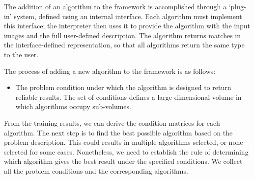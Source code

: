 The addition of an algorithm to the framework is accomplished through a `plug-in' system, defined using an internal interface. Each algorithm must implement this interface; the interpreter then uses it to provide the algorithm with the input images and the full user-defined description. The algorithm returns matches in the interface-defined representation, so that all algorithms return the same type to the user.

The process of adding a new algorithm to the framework is as follows:
\begin{itemize}
\item The problem condition under which the algorithm is designed to return reliable results. The set of conditions defines a large dimensional volume in which algorithms occupy sub-volumes.
\end{itemize}

From the training results, we can derive the condition matrices for each algorithm. The next step is to find the best possible algorithm based on the problem description. This could results in multiple algorithms selected, or none selected for some cases. Nonetheless, we need to establish the rule of determining which algorithm gives the best result under the specified conditions. We collect all the problem conditions and the corresponding algorithms.

